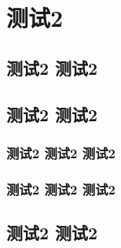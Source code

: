 \chapter{测试2 }
\section{测试2 测试2 }
\section{测试2 测试2 }
\blindtext
\subsection{测试2 测试2 测试2 }
\blindtext
\subsection{测试2 测试2 测试2 }
\blindtext
\section{测试2 测试2 }
\blindtext

\endinput